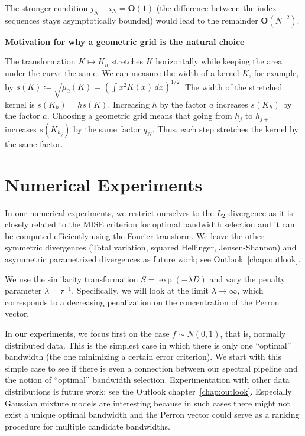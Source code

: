 The stronger condition $j_N-i_N=\mathbf{O}(1)$ (the difference between the index sequences stays asymptotically bounded) would lead to the remainder $\mathbf{O}(N^{-2})$.

\textbf{Motivation for why a geometric grid is the natural choice}

The transformation $K\mapsto K_h$ stretches $K$ horizontally while keeping the area under the curve the same. We can measure the width of a kernel $K$, for example, by $s(K)\coloneqq\sqrt{\mu_2(K)}=(\int x^2K(x)\,dx)^{1/2}$. The width of the stretched kernel is $s(K_h)=hs(K)$. Increasing $h$ by the factor $a$ increases $s(K_h)$ by the factor $a$. Choosing a geometric grid means that going from $h_j$ to $h_{j+1}$ increases $s(K_{h_j})$ by the same factor $q_N$. Thus, each step stretches the kernel by the same factor.

\section{Numerical Experiments}


In our numerical experiments, we restrict ourselves to the $L_2$ divergence as it is closely related to the MISE criterion for optimal bandwidth selection and it can be computed efficiently using the Fourier transform. We leave the other symmetric divergences (Total variation, squared Hellinger, Jensen-Shannon) and asymmetric parametrized divergences as future work; see Outlook~\ref{chap:outlook}.

We use the similarity transformation $S=\exp{(-\lambda D)}$ and vary the penalty parameter $\lambda=\tau^{-1}$. Specifically, we will look at the limit $\lambda\to\infty$, which corresponds to a decreasing penalization on the concentration of the Perron vector. 

In our experiments, we focus first on the case $f\sim N(0,1)$, that is, normally distributed data. This is the simplest case in which there is only one \enquote{optimal} bandwidth (the one minimizing a certain error criterion). We start with this simple case to see if there is even a connection between our spectral pipeline and the notion of \enquote{optimal} bandwidth selection. Experimentation with other data distributions is future work; see the Outlook chapter~\ref{chap:outlook}. Especially Gaussian mixture models are interesting because in such cases there might not exist a unique optimal bandwidth and the Perron vector could serve as a ranking procedure for multiple candidate bandwidths.

